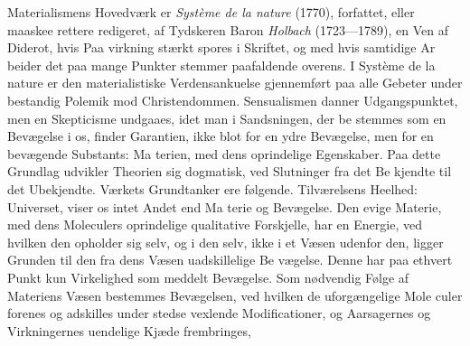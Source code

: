 \documentclass[12pt,a4paper]{book}
\begin{document}
Materialismens Hovedværk er \emph{Système de la nature}
(1770), forfattet, eller maaskee rettere redigeret, af Tydskeren
Baron \emph{Holbach} (1723---1789), en Ven af Diderot, hvis Paa\-%
virkning stærkt spores i Skriftet, og med hvis samtidige Ar\-%
beider det paa mange Punkter stemmer paafaldende overens.
I Système de la nature er den materialistiske Verdensankuelse
gjennemført paa alle Gebeter under bestandig Polemik mod
Christendommen. Sensualismen danner Udgangspunktet, men
en Skepticisme undgaaes, idet man i Sandsningen, der be\-%
stemmes som en Bevægelse i os, finder Garantien, ikke blot
for en ydre Bevægelse, men for en bevægende Substants: Ma\-%
terien, med dens oprindelige Egenskaber. Paa dette Grundlag
udvikler Theorien sig dogmatisk, ved Slutninger fra det Be\-%
kjendte til det Ubekjendte. Værkets Grundtanker ere følgende.
Tilværelsens Heelhed: Universet, viser os intet Andet end Ma\-%
terie og Bevægelse. Den evige Materie, med dens Moleculers
oprindelige qualitative Forskjelle, har en Energie, ved hvilken
den opholder sig selv, og i den selv, ikke i et Væsen udenfor
den, ligger Grunden til den fra dens Væsen uadskillelige Be\-%
vægelse. Denne har paa ethvert Punkt kun Virkelighed som
meddelt Bevægelse. Som nødvendig Følge af Materiens Væsen
bestemmes Bevægelsen, ved hvilken de uforgængelige Mole\-%
culer forenes og adskilles under stedse vexlende Modificationer,
og Aarsagernes og Virkningernes uendelige Kjæde frembringes,
\end{document}
